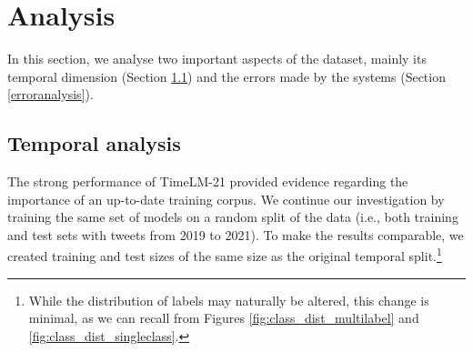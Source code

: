 \section{Analysis}
\label{analysis}
In this section, we analyse two important aspects of the {\TweetTopic} dataset, mainly its temporal dimension (Section \ref{sec:temporal}) and the errors made by the systems (Section \ref{erroranalysis}). 

\subsection{Temporal analysis}
\label{sec:temporal}

The strong performance of TimeLM-21 provided evidence regarding the importance of an up-to-date training corpus. We continue our investigation by training the same set of models on a random split of the data (i.e., both training and test sets with tweets from 2019 to 2021). To make the results comparable, we created training and test sizes of the same size as the original temporal split.\footnote{While the distribution of labels may naturally be altered, this change is minimal, as we can recall from Figures \ref{fig:class_dist_multilabel} and \ref{fig:class_dist_singleclass}.} 

